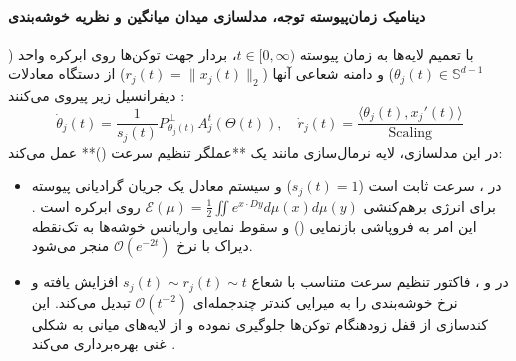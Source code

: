\paragraph*{دینامیک زمان‌پیوسته توجه، مدلسازی میدان میانگین و نظریه خوشه‌بندی}
با تعمیم لایه‌ها به زمان پیوسته $t \in [0, \infty)$، بردار جهت توکن‌ها روی ابرکره واحد ($\theta_j(t) \in \mathbb{S}^{d-1}$) و دامنه شعاعی آنها ($r_j(t) = \|x_j(t)\|_2$) از دستگاه معادلات دیفرانسیل زیر پیروی می‌کنند \cite{burger2025meanfield, karagodin2025normalization}:
\begin{equation}
    \dot{\theta}_j(t) = \frac{1}{s_j(t)} P_{\theta_j(t)}^\perp A_j^t(\Theta(t)), \quad \dot{r}_j(t) = \frac{\langle \theta_j(t), x_j'(t) \rangle}{\text{Scaling}}
\end{equation}
در این مدلسازی، لایه نرمال‌سازی مانند یک **عملگر تنظیم سرعت ()** عمل می‌کند:
\begin{itemize}
    \item در ، سرعت ثابت است ($s_j(t) = 1$) و سیستم معادل یک جریان گرادیانی پیوسته برای انرژی برهم‌کنشی $\mathcal{E}(\mu) = \frac{1}{2} \iint e^{x \cdot Dy} d\mu(x)d\mu(y)$ روی ابرکره است \cite{burger2025meanfield}. این امر به فروپاشی بازنمایی () و سقوط نمایی واریانس خوشه‌ها به تک‌نقطه دیراک با نرخ $\mathcal{O}(e^{-2t})$ منجر می‌شود.
    \item در  و ، فاکتور تنظیم سرعت متناسب با شعاع $s_j(t) \sim r_j(t) \sim t$ افزایش یافته و نرخ خوشه‌بندی را به میرایی کندتر چندجمله‌ای $\mathcal{O}(t^{-2})$ تبدیل می‌کند. این کندسازی از قفل زودهنگام توکن‌ها جلوگیری نموده و از لایه‌های میانی به شکلی غنی بهره‌برداری می‌کند \cite{karagodin2025normalization}.
\end{itemize}

